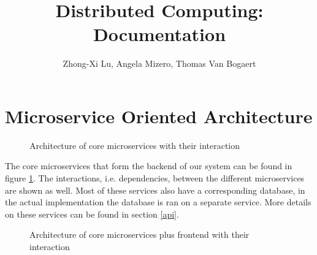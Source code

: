 \documentclass{article}
\title{Distributed Computing: Documentation}
\author{Zhong-Xi Lu, Angela Mizero, Thomas Van Bogaert}
\date{}
\begin{document}
\maketitle

\section{Microservice Oriented Architecture}

\begin{figure}[H]
    \begin{center}
    \end{center}
    \caption{Architecture of core microservices with their interaction \label{fig:arch}}
\end{figure}

The core microservices that form the backend of our system can be found in figure \ref{fig:arch}. The interactions, i.e. dependencies, between the different microservices are shown as well. Most of these services also have a corresponding database, in the actual implementation the database is ran on a separate service. More details on these services can be found in section \ref{api}.

\begin{figure}[H]
    \begin{center}
    \end{center}
    \caption{Architecture of core microservices plus frontend with their interaction}
    \label{fig:arch_frontend}
\end{figure}
\end{document}
